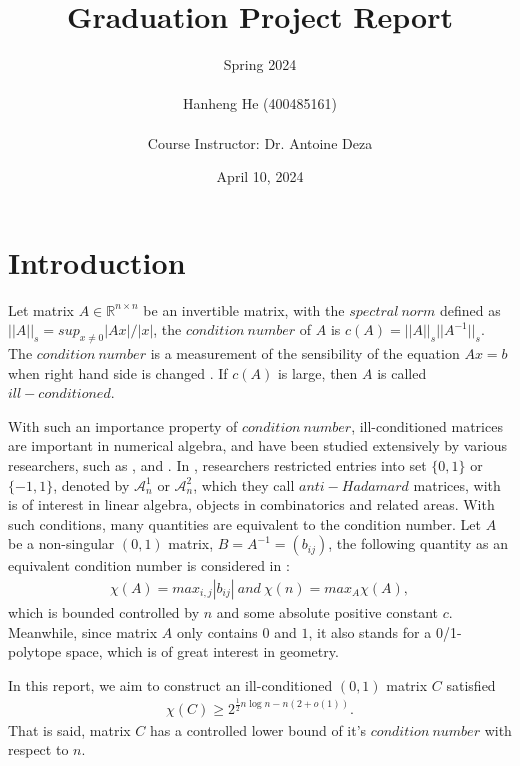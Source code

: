 \documentclass[11pt]{article}
\title{\textbf{ Graduation Project Report }}
\author{Spring 2024 \\ \\ Hanheng He (400485161) \\ \\ Course Instructor: Dr. Antoine Deza }
\date{April 10, 2024}
\begin{document}
\maketitle

\pagestyle{fancy}

\tableofcontents



\pagebreak
\section{Introduction}

Let matrix $A \in \mathbb{R}^{n\times n}$ be an invertible matrix, with the $spectral \ norm$ defined as $||A||_s = sup_{x\neq0}|Ax|/|x|$, the $condition\ number$ of $A$ is $c(A) = ||A||_s||A^{-1}||_s$. The $condition\ number$ is a measurement of the sensibility of the equation $Ax = b$ when right hand side is changed \cite{ALON1997133}. If $c(A)$ is large, then $A$ is called $ill-conditioned$.

With such an importance property of $condition\ number$, ill-conditioned matrices are important
in numerical algebra, and have been studied extensively by various researchers, such as \cite{doi:10.1137/1018113}, \cite{wilkinson1972note} and \cite{neumaier1998solving}. In \cite{GRAHAM1984113}, researchers restricted entries into set $\{0, 1\}$ or $\{-1, 1\}$, denoted by $\mathcal{A}_n^1$ or $\mathcal{A}_n^2$, which they call $anti-Hadamard$ matrices, with is of interest in linear algebra, objects in combinatorics and related areas. With such conditions, many quantities are equivalent to the condition number. Let $A$ be a non-singular $(0, 1)$ matrix, $B = A^{-1} = (b_{ij})$, the following quantity as an equivalent condition number is considered in \cite{GRAHAM1984113}:
\begin{align*}
\chi(A) = max_{i, j}|b_{ij}|\ and\ \chi(n) = max_A \chi(A),
\end{align*}
which is bounded controlled by $n$ and some absolute positive constant $c$. Meanwhile, since matrix $A$ only contains $0$ and $1$, it also stands for a 0/1-polytope space, which is of great interest in geometry.

In this report, we aim to construct an ill-conditioned $(0, 1)$ matrix $C$ satisfied
\begin{align*}
\chi(C) \geq2^{\frac{1}{2}n\log n-n(2+o(1))}.
\end{align*}
That is said, matrix $C$ has a controlled lower bound of it's $condition\ number$ with respect to $n$. 
\end{document}
